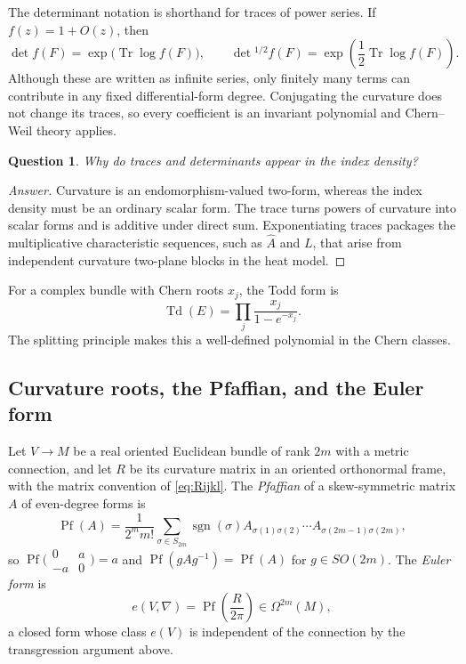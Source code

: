 \documentclass[11pt,oneside,reqno]{book}
\DeclareMathOperator{\Tr}{Tr}
\newcommand{\Ahat}{\widehat A}
\theoremstyle{plain}
\newtheorem{question}[theorem]{Question}
\theoremstyle{definition}
\theoremstyle{remark}
\newenvironment{answer}{\begin{proof}[Answer]}{\end{proof}}
\begin{document}
The determinant notation is shorthand for traces of power series.  If
\(f(z)=1+O(z)\), then
\[
 \det f(F)=\exp\bigl(\Tr\log f(F)\bigr),
 \qquad
 \det{}^{1/2}f(F)
 =\exp\!\left(\frac12\Tr\log f(F)\right).
\]
Although these are written as infinite series, only finitely many terms can
contribute in any fixed differential-form degree.  Conjugating the curvature
does not change its traces, so every coefficient is an invariant polynomial
and Chern--Weil theory applies.

\begin{question}
Why do traces and determinants appear in the index density?
\end{question}

\begin{answer}
Curvature is an endomorphism-valued two-form, whereas the index density must
be an ordinary scalar form.  The trace turns powers of curvature into scalar
forms and is additive under direct sum.  Exponentiating traces packages the
multiplicative characteristic sequences, such as \(\Ahat\) and \(L\), that
arise from independent curvature two-plane blocks in the heat model.
\end{answer}

For a complex bundle with Chern roots \(x_j\), the Todd form is
\[
 \operatorname{Td}(E)=\prod_j\frac{x_j}{1-e^{-x_j}}.
\]
The splitting principle makes this a well-defined polynomial in the Chern
classes.

\subsection*{Curvature roots, the Pfaffian, and the Euler form}

Let \(V\to M\) be a real oriented Euclidean bundle of rank \(2m\) with a
metric connection, and let \(R\) be its curvature matrix in an oriented
orthonormal frame, with the matrix convention of \eqref{eq:Rijkl}.  The
\emph{Pfaffian} of a skew-symmetric matrix \(A\) of even-degree forms is
\[
 \operatorname{Pf}(A)
 =\frac{1}{2^mm!}\sum_{\sigma\in S_{2m}}\operatorname{sgn}(\sigma)
  A_{\sigma(1)\sigma(2)}\cdots A_{\sigma(2m-1)\sigma(2m)},
\]
so \(\operatorname{Pf}\bigl(\begin{smallmatrix}0&a\\-a&0
\end{smallmatrix}\bigr)=a\) and
\(\operatorname{Pf}(gAg^{-1})=\operatorname{Pf}(A)\) for
\(g\in SO(2m)\).  The \emph{Euler form} is
\[
 e(V,\nabla)=\operatorname{Pf}\!\left(\frac{R}{2\pi}\right)
 \in\Omega^{2m}(M),
\]
a closed form whose class \(e(V)\) is independent of the connection by the
transgression argument above.
\end{document}
